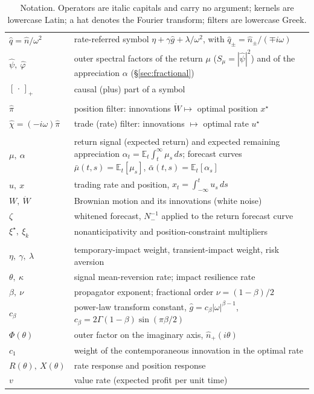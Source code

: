 \documentclass[11pt]{article}
\newcommand{\E}{\mathbb{E}}
\newcommand{\pluspart}[1]{\left[#1\right]_+}
\theoremstyle{plain}
\theoremstyle{definition}
\theoremstyle{remark}
\begin{document}
\begin{table}[t]
\begin{tabularx}{\textwidth}{@{}lX@{}}
$\hat q=\hat n/\omega^2$ & rate-referred symbol $\eta+\gamma\hat g+\lambda/\omega^2$, with $\hat q_\pm=\hat n_\pm/(\mp i\omega)$ \\
$\hat\psi,\ \hat\varphi$ & outer spectral factors of the return $\mu$ ($S_\mu=|\hat\psi|^2$) and of the appreciation $\alpha$ (\S\ref{sec:fractional}) \\
$\pluspart{\,\cdot\,}$ & causal (plus) part of a symbol \\
\addlinespace
\multicolumn{2}{@{}l}{\emph{Filters}}\\
$\hat\pi$ & position filter: innovations $\dot W\mapsto$ optimal position $x^\star$ \\
$\hat\chi=(-i\omega)\hat\pi$ & trade (rate) filter: innovations $\mapsto$ optimal rate $u^\star$ \\
\addlinespace
\multicolumn{2}{@{}l}{\emph{Processes}}\\
$\mu,\ \alpha$ & return signal (expected return) and expected remaining appreciation $\alpha_t=\E_t\int_t^\infty\mu_s\,ds$; forecast curves $\bar\mu(t,s)=\E_t[\mu_s]$, $\bar\alpha(t,s)=\E_t[\alpha_s]$ \\
$u,\ x$ & trading rate and position, $x_t=\int_{-\infty}^t u_s\,ds$ \\
$W,\ \dot W$ & Brownian motion and its innovations (white noise) \\
$\zeta$ & whitened forecast, $N_-^{-1}$ applied to the return forecast curve \\
$\xi^\star,\ \xi_k$ & nonanticipativity and position-constraint multipliers \\
\addlinespace
\multicolumn{2}{@{}l}{\emph{Scalars}}\\
$\eta,\ \gamma,\ \lambda$ & temporary-impact weight, transient-impact weight, risk aversion \\
$\theta,\ \kappa$ & signal mean-reversion rate; impact resilience rate \\
$\beta,\ \nu$ & propagator exponent; fractional order $\nu=(1-\beta)/2$ \\
$c_\beta$ & power-law transform constant, $\hat g=c_\beta|\omega|^{\beta-1}$, $c_\beta=2\Gamma(1-\beta)\sin(\pi\beta/2)$ \\
$\Phi(\theta)$ & outer factor on the imaginary axis, $\hat n_+(i\theta)$ \\
$c_1$ & weight of the contemporaneous innovation in the optimal rate \\
$R(\theta),\ X(\theta)$ & rate response and position response \\
$v$ & value rate (expected profit per unit time) \\
\bottomrule
\end{tabularx}
\caption{Notation. Operators are italic capitals and carry no argument; kernels are lowercase Latin; a hat denotes the Fourier transform; filters are lowercase Greek.}
\label{tab:notation}
\end{table}
\end{document}
